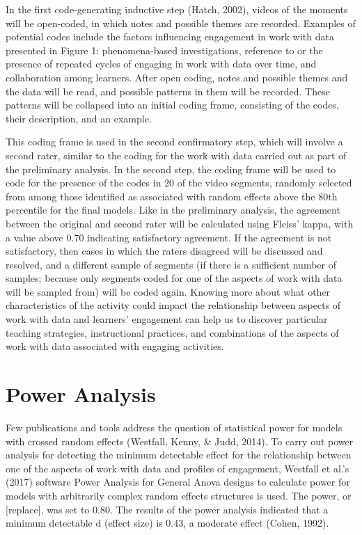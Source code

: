 \documentclass[]{book}
\theoremstyle{definition}
\theoremstyle{definition}
\theoremstyle{definition}
\theoremstyle{remark}
\begin{document}
In the first code-generating inductive step (Hatch, 2002), videos of the
moments will be open-coded, in which notes and possible themes are
recorded. Examples of potential codes include the factors influencing
engagement in work with data presented in Figure 1: phenomena-based
investigations, reference to or the presence of repeated cycles of
engaging in work with data over time, and collaboration among learners.
After open coding, notes and possible themes and the data will be read,
and possible patterns in them will be recorded. These patterns will be
collapsed into an initial coding frame, consisting of the codes, their
description, and an example.

This coding frame is used in the second confirmatory step, which will
involve a second rater, similar to the coding for the work with data
carried out as part of the preliminary analysis. In the second step, the
coding frame will be used to code for the presence of the codes in 20 of
the video segments, randomly selected from among those identified as
associated with random effects above the 80th percentile for the final
models. Like in the preliminary analysis, the agreement between the
original and second rater will be calculated using Fleiss' kappa, with a
value above 0.70 indicating satisfactory agreement. If the agreement is
not satisfactory, then cases in which the raters disagreed will be
discussed and resolved, and a different sample of segments (if there is
a sufficient number of samples; because only segments coded for one of
the aspects of work with data will be sampled from) will be coded again.
Knowing more about what other characteristics of the activity could
impact the relationship between aspects of work with data and learners'
engagement can help us to discover particular teaching strategies,
instructional practices, and combinations of the aspects of work with
data associated with engaging activities.

\section{Power Analysis}\label{power-analysis}

Few publications and tools address the question of statistical power for
models with crossed random effects (Westfall, Kenny, \& Judd, 2014). To
carry out power analysis for detecting the minimum detectable effect for
the relationship between one of the aspects of work with data and
profiles of engagement, Westfall et al.'s (2017) software Power Analysis
for General Anova designs to calculate power for models with arbitrarily
complex random effects structures is used. The power, or {[}replace{]},
was set to 0.80. The results of the power analysis indicated that a
minimum detectable d (effect size) is 0.43, a moderate effect (Cohen,
1992).
\end{document}
